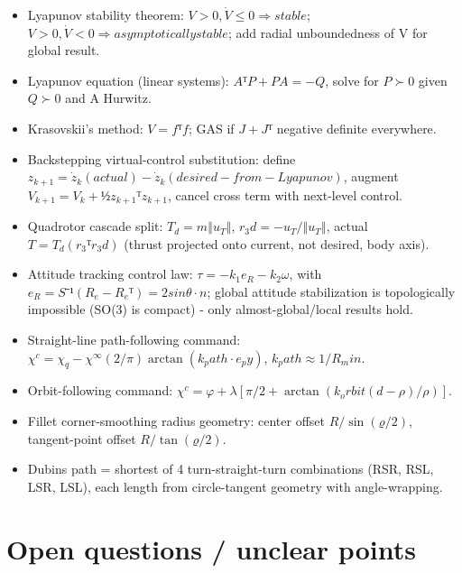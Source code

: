 \documentclass[11pt]{article}
\begin{document}
\begin{itemize}
\item Lyapunov stability theorem: $V>0, \dot{V}≤0 ⇒ stable$; $V>0, \dot{V}<0 ⇒ asymptotically stable$; add radial unboundedness of V for global result.
\item Lyapunov equation (linear systems): $AᵀP + PA = -Q$, solve for $P≻0$ given $Q≻0$ and A Hurwitz.
\item Krasovskii's method: $V=fᵀf$; GAS if $J+Jᵀ$ negative definite everywhere.
\item Backstepping virtual-control substitution: define $z_{k+1} = \dot{z}_k(actual) - \dot{z}_k(desired-from-Lyapunov)$, augment $V_{k+1}=V_k+½z_{k+1}ᵀz_{k+1}$, cancel cross term with next-level control.
\item Quadrotor cascade split: $T_d = m‖u_T‖$, $r_3d = -u_T/‖u_T‖$, actual $T = T_d(r_3ᵀr_3d)$ (thrust projected onto current, not desired, body axis).
\item Attitude tracking control law: $τ = -k_1 e_R - k_2ω$, with $e_R = S⁻¹(R_e-R_eᵀ) = 2 sinθ·n$; global attitude stabilization is topologically impossible (SO(3) is compact) - only almost-global/local results hold.
\item Straight-line path-following command: $χ^c = χ_q - χ^∞(2/π)\arctan(k_path·e_py)$, $k_path ≈ 1/R_min$.
\item Orbit-following command: $χ^c = φ + λ[π/2 + \arctan(k_orbit(d-ρ)/ρ)]$.
\item Fillet corner-smoothing radius geometry: center offset $R/\sin(ϱ/2)$, tangent-point offset $R/\tan(ϱ/2)$.
\item Dubins path = shortest of 4 turn-straight-turn combinations (RSR, RSL, LSR, LSL), each length from circle-tangent geometry with angle-wrapping.
\end{itemize}

\section{Open questions / unclear points}
\end{document}
